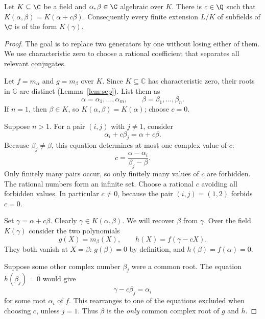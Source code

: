 \begin{theorem}\label{thm:primitiveelement}
Let $K\subseteq\C$ be a field and $\alpha,\beta\in\C$ algebraic over $K$. There is $c\in\Q$ such that $K(\alpha,\beta)=K(\alpha+c\beta)$. Consequently every finite extension $L/K$ of subfields of $\C$ is of the form $K(\gamma)$.
\end{theorem}
\begin{proof}
The goal is to replace two generators
by one without losing either of them.
We use characteristic zero to choose
a rational coefficient that separates
all relevant conjugates.

Let $f=m_\alpha$ and $g=m_\beta$
over $K$. Since $K\subseteq\mathbb C$
has characteristic zero, their roots
in $\mathbb C$ are distinct
(Lemma~\ref{lem:sep}). List them as
\[
\alpha=\alpha_1,\ldots,\alpha_m,
\qquad
\beta=\beta_1,\ldots,\beta_n.
\]
If $n=1$, then $\beta\in K$,
so $K(\alpha,\beta)=K(\alpha)$;
choose $c=0$.

Suppose $n>1$. For a pair
$(i,j)$ with $j\ne1$, consider
\[
\alpha_i+c\beta_j
=\alpha+c\beta.
\]
Because $\beta_j\ne\beta$,
this equation determines at most
one complex value of $c$:
\[
c=\frac{\alpha-\alpha_i}
        {\beta_j-\beta}.
\]
Only finitely many pairs occur,
so only finitely many values of $c$
are forbidden. The rational numbers
form an infinite set. Choose a
rational $c$ avoiding all forbidden
values. In particular $c\ne0$,
because the pair $(i,j)=(1,2)$
forbids $c=0$.

Set $\gamma=\alpha+c\beta$.
Clearly $\gamma\in K(\alpha,\beta)$.
We will recover $\beta$ from $\gamma$.
Over the field $K(\gamma)$ consider
the two polynomials
\[
g(X)=m_\beta(X),\qquad
h(X)=f(\gamma-cX).
\]
They both vanish at $X=\beta$:
$g(\beta)=0$ by definition, and
$h(\beta)=f(\alpha)=0$.

Suppose some other complex number
$\beta_j$ were a common root.
The equation $h(\beta_j)=0$
would give
\[
\gamma-c\beta_j=\alpha_i
\]
for some root $\alpha_i$ of $f$.
This rearranges to one of the
equations excluded when choosing $c$,
unless $j=1$. Thus $\beta$ is
the \emph{only} common complex root
of $g$ and $h$.


\end{proof}
